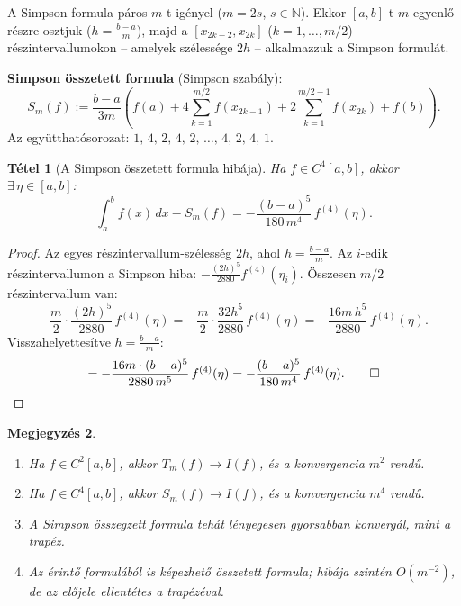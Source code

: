 \documentclass[a4paper,12pt]{article}
\theoremstyle{mydef}
\newtheorem{tetel}{Tétel}[section]
\newtheorem{megjegyzes}[tetel]{Megjegyzés}
\newcommand{\N}{\mathbb{N}}
\begin{document}
A Simpson formula páros $m$-t igényel ($m = 2s$, $s \in \N$). Ekkor $[a,b]$-t $m$ egyenlő
részre osztjuk ($h = \tfrac{b-a}{m}$), majd a $[x_{2k-2}, x_{2k}]$ ($k = 1, \ldots, m/2$)
részintervallumokon -- amelyek szélessége $2h$ -- alkalmazzuk a Simpson formulát.

\begin{mdframed}[backgroundcolor=thmbg,linewidth=0pt,innertopmargin=8pt,innerbottommargin=8pt]
\textbf{Simpson összetett formula} (Simpson szabály):
\[
  S_m(f) := \frac{b-a}{3m}
  \left(f(a) + 4\sum_{k=1}^{m/2} f(x_{2k-1}) + 2\sum_{k=1}^{m/2-1} f(x_{2k}) + f(b)\right).
\]
Az együtthatósorozat: $1,\,4,\,2,\,4,\,2,\,\ldots,\,4,\,2,\,4,\,1$.
\end{mdframed}

\begin{mdframed}[backgroundcolor=thmbg,linewidth=0pt,innertopmargin=8pt,innerbottommargin=8pt]
\begin{tetel}[A Simpson összetett formula hibája]
\label{tetel:simpsonosszetett}
Ha $f \in C^4[a,b]$, akkor $\exists\,\eta \in [a,b]$:
\[
  \int_a^b f(x)\,dx - S_m(f) = -\frac{(b-a)^5}{180\,m^4}\,f^{(4)}(\eta).
\]
\end{tetel}
\end{mdframed}

\begin{proof}
Az egyes részintervallum-szélesség $2h$, ahol $h = \tfrac{b-a}{m}$.
Az $i$-edik részintervallumon a Simpson hiba: $-\tfrac{(2h)^5}{2880}f^{(4)}(\eta_i)$.
Összesen $m/2$ részintervallum van:
\[
  -\frac{m}{2}\cdot\frac{(2h)^5}{2880}\,f^{(4)}(\eta)
  = -\frac{m}{2}\cdot\frac{32h^5}{2880}\,f^{(4)}(\eta)
  = -\frac{16m\,h^5}{2880}\,f^{(4)}(\eta).
\]
Visszahelyettesítve $h = \tfrac{b-a}{m}$:
\[
  = -\frac{16m \cdot (b-a)^5}{2880\,m^5}\,f^{(4)}(\eta)
  = -\frac{(b-a)^5}{180\,m^4}\,f^{(4)}(\eta). \qed
\]
\end{proof}

\begin{megjegyzes}
\leavevmode
\begin{enumerate}[noitemsep,topsep=2pt]
  \item Ha $f \in C^2[a,b]$, akkor $T_m(f) \to I(f)$, és a konvergencia $m^2$ rendű.
  \item Ha $f \in C^4[a,b]$, akkor $S_m(f) \to I(f)$, és a konvergencia $m^4$ rendű.
  \item A Simpson összegzett formula tehát lényegesen gyorsabban konvergál, mint a trapéz.
  \item Az érintő formulából is képezhető összetett formula; hibája szintén $O(m^{-2})$,
        de az előjele ellentétes a trapézéval.
\end{enumerate}
\end{megjegyzes}
\end{document}
